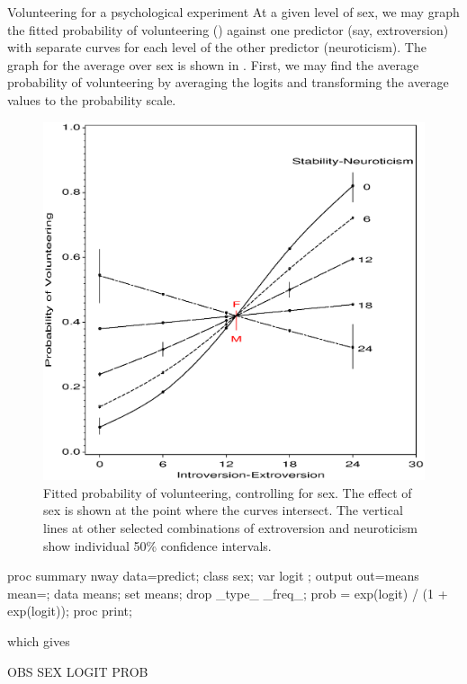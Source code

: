 \begin{Example}[davis]{Volunteering for a psychological experiment}
At a given level of sex, we may graph the fitted probability of volunteering
() against one predictor (say, extroversion) with separate
curves for each level of the other predictor (neuroticism).
The graph for the average over sex is shown in .
First, we may find the average probability of volunteering
by averaging the logits and transforming the average values to the
probability scale.
\begin{figure}[htb]
  \centering
  \includegraphics[scale=.6]{ch6/fig/davisn2}
  \caption[Fitted probability of volunteering, controlling for sex]{Fitted probability of volunteering, controlling for sex.  The effect of sex is shown
  at the point where the curves intersect.  The vertical lines at other
  selected combinations of extroversion and neuroticism show individual
  50\% confidence intervals.}%
  \label{fig:davisn2}
\end{figure}
\begin{listing}
proc summary nway data=predict;
   class sex;
   var logit ;
   output out=means mean=;
data means;
   set means;
   drop _type_ _freq_;
   prob = exp(logit) / (1 + exp(logit));
proc print;
\end{listing}
which gives
\begin{output}
                     OBS    SEX      LOGIT       PROB


\end{output}
\end{Example}
